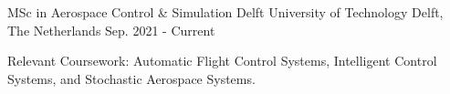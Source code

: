   \cventry
    {MSc in Aerospace Control \& Simulation} %
    {Delft University of Technology} %
    {Delft, The Netherlands} %
    {Sep. 2021 - Current} %
    {
      \begin{cvitems} %
        \item {Relevant Coursework: Automatic Flight Control Systems, Intelligent Control Systems, and
Stochastic Aerospace Systems.}
      \end{cvitems}
    }

